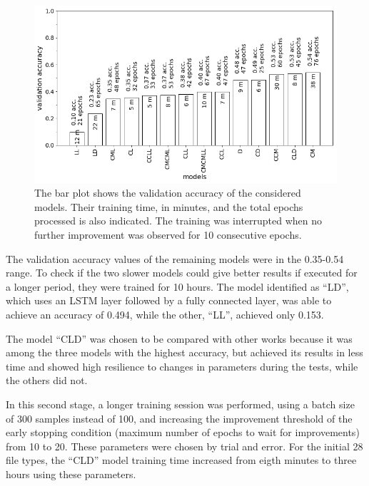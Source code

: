 \noindent
\begin{figure}[htb!]
\centering\includegraphics[width=1.0\textwidth]{content/models.png}
\caption[Validation accuracy of models]{\label{fig:models}The bar plot shows the validation accuracy of the considered models. Their training time, in minutes, and the total epochs processed is also indicated. The training was interrupted when no further improvement was observed for 10 consecutive epochs.}%
\end{figure}

The validation accuracy values of the remaining models were in the 0.35-0.54 range.
To check if the two slower models could give better results if executed for a longer period, they were trained for 10 hours. The model identified as ``LD'', which uses an LSTM layer followed by a fully connected layer, was able to achieve an accuracy of 0.494, while the other, ``LL'', achieved only 0.153.

The model ``CLD'' was chosen to be compared with other works because it was among the three models with the highest accuracy, but achieved its results in less time and showed high resilience to changes in parameters during the tests, while the others did not.


In this second stage, a longer training session was performed, using a batch size of 300 samples instead of 100, and increasing the improvement threshold of the early stopping condition (maximum number of epochs to wait for improvements) from 10 to 20. These parameters were chosen by trial and error. For the initial 28 file types, the ``CLD'' model training time increased from eigth minutes to three hours using these parameters.
 
